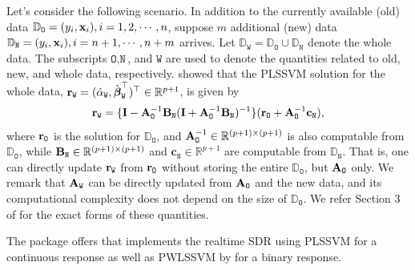 Let's consider the following scenario. In addition to the currently available (old) data $\mathbb{D}_{\texttt{O}} = (y_i, \mathbf{x}_i), i = 1, 2, \cdots, n$, suppose $m$ additional (new) data $\mathbb{D}_{\texttt{N}} = (y_i, \mathbf{x}_i), i = n+1, \cdots, n+m$ arrives. Let $\mathbb{D}_{\texttt{W}} = \mathbb{D}_{\texttt{O}} \cup \mathbb{D}_{\texttt{N}}$ denote the whole data. The subscripts $\texttt{O}, \texttt{N}$, and $\texttt{W}$ are used to denote the quantities related to old, new, and whole data, respectively.  
\citet{artemiou2021real} showed that the PLSSVM solution for the whole data, ${\mathbf{r}}_{\texttt{W}} = (\hat{\alpha}_{\texttt{W}},\hat {\boldsymbol{\beta}}_{\texttt{W}}^\top)^\top\in \mathbb{R}^{p+1}$, is given by
\begin{align}\label{eqn:rtpsdr_coef}
\mathbf{r}_{\texttt{W}} = \{\mathbf{I} - \mathbf{A}_{\texttt{O}}^{-1} \mathbf{B}_{\texttt{N}} (\mathbf{I} + \mathbf{A}_{\texttt{O}}^{-1} \mathbf{B}_{\texttt{N}})^{-1} \} ( \mathbf{r}_{\texttt{O}} + \mathbf{A}_{\texttt{O}}^{-1}\mathbf{c}_{\texttt{N}} ),
\end{align}
where $\mathbf{r}_{\texttt{O}}$ is the solution for $\mathbb{D}_{\texttt{O}}$, and $\mathbf{A}_{\texttt{O}}^{-1} \in \mathbb{R}^{{(p+1)}\times {(p+1)}}$ is also computable from $\mathbb{D}_{\texttt{O}}$, while $\mathbf{B}_{\texttt{N}} \in \mathbb{R}^{{(p+1)}\times {(p+1)}}$ and $\mathbf{c}_{\texttt{N}} \in \mathbb{R}^{p+1}$ are computable from $\mathbb{D}_{\texttt{N}}$. That is, one can directly update $\mathbf{r}_{\texttt{W}}$ from $\mathbf{r}_{\texttt{O}}$ without storing the entire $\mathbb{D}_{\texttt{O}}$, but $\mathbf{A}_{\texttt{O}}$ only. We remark that $\mathbf{A}_{\texttt{W}}$ can be directly updated from $\mathbf{A}_{\texttt{O}}$ and the new data, and its computational complexity does not depend on the size of $\mathbb{D}_\texttt{O}$. We refer Section 3 of \citet{artemiou2021real} for the exact forms of these quantities.

The  package offers  that implements the realtime SDR using PLSSVM for a continuous response as well as PWLSSVM by \citet{jang2023principal} for a binary response.

